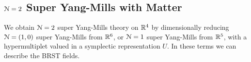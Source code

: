 \documentclass[10pt, oneside]{article}
\begin{document}
%
%
%


\subsection{\texorpdfstring{$\mathcal N=2$}{N=2} Super Yang-Mills with Matter} \label{4d_2_section}

We obtain $\mathcal{N}=2$ super Yang-Mills theory on $\mathbb R^4$ by dimensionally reducing $\mathcal{N}=(1,0)$ super Yang-Mills from $\mathbb R^6$, or $\mathcal{N}=1$ super Yang-Mills from $\mathbb R^5$, with a hypermultiplet valued in a symplectic representation $U$.  In these terms we can describe the BRST fields.
\end{document}

